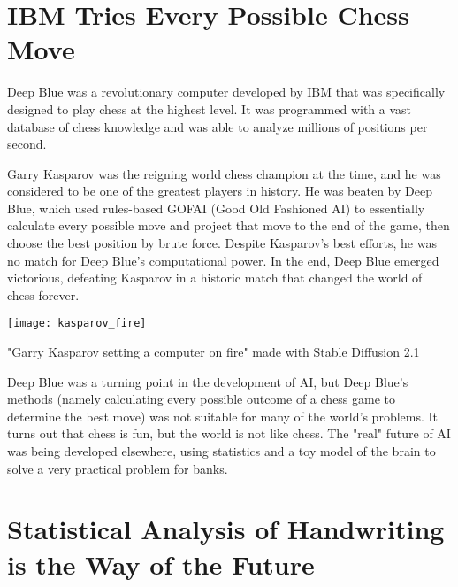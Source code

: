 \section{IBM Tries Every Possible Chess Move}

Deep Blue was a revolutionary computer developed by IBM that was specifically designed to play chess at the highest level. It was programmed with a vast database of chess knowledge and was able to analyze millions of positions per second.

Garry Kasparov was the reigning world chess champion at the time, and he was considered to be one of the greatest players in history. He was beaten by Deep Blue, which used rules-based GOFAI (Good Old Fashioned AI) to essentially calculate every possible move and project that move to the end of the game, then choose the best position by brute force. Despite Kasparov’s best efforts, he was no match for Deep Blue’s computational power. In the end, Deep Blue emerged victorious, defeating Kasparov in a historic match that changed the world of chess forever.

\begin{pdf}
\begin{marginfigure}[-5.5cm]
        \texttt{[image: kasparov\_fire]}
	\caption{"Garry Kasparov setting a computer on fire" made with Stable Diffusion 2.1}
\end{marginfigure}
\end{pdf}

Deep Blue was a turning point in the development of AI, but Deep Blue’s methods (namely calculating every possible outcome of a chess game to determine the best move) was not suitable for many of the world’s problems. It turns out that chess is fun, but the world is not like chess. The "real" future of AI was being developed elsewhere, using statistics and a toy model of the brain to solve a very practical problem for banks.

\section{Statistical Analysis of Handwriting is the Way of the Future}

